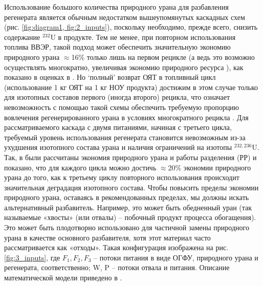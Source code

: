 Использование большого количества природного урана для разбавления регенерата является обычным недостатком вышеупомянутых каскадных схем (рис. \ref{fig:diagram1, fig:2_inputs}), поскольку необходимо, прежде всего, снизить содержание $^{232}$U в продукте. Тем не менее, при повторном использования топлива ВВЭР, такой подход может обеспечить значительную экономию природного урана $\approx$16\% только лишь на первом рецикле (а ведь это возможно осуществлять многократно, увеличивая экономию природного ресурса \cite{colemanEvaluationMultipleSelfrecycling2010}), как показано в оценках в \cite{smirnovEvolutionIsotopicComposition2012}. Но `полный' возврат ОЯТ в топливный цикл (использование 1 кг ОЯТ на 1 кг НОУ продукта) достижим в этом случае только для изотопных составов первого (иногда второго) рецикла, что означает невозможность с помощью такой схемы обеспечить требуемую пропорцию вовлечения регенерированного урана в условиях многократного рецикла \cite{smirnovApplyingEnrichmentCapacities2018}.
Для рассматриваемого каскада с двумя питаниями, начиная с третьего цикла, требуемый уровень использования регенерата становится невозможным из-за ухудшения изотопного состава урана и наличия ограничений на изотопы $^{232,236}$U.
Так, в \cite{smirnovApplyingEnrichmentCapacities2018} были рассчитаны экономия природного урана и работы разделения (РР) и показано, что для каждого цикла можно достичь $\approx$20\% экономии природного урана до того, как к третьему циклу повторного использования происходит значительная деградация изотопного состава.
Чтобы повысить пределы экономии природного урана, оставаясь в рекомендованных пределах, мы должны искать альтернативный разбавитель. Например, это может быть обедненный уран (так называемые «хвосты» (или отвалы) -- побочный продукт процесса обогащения). Это может быть плодотворно использовано для частичной замены природного урана в качестве основного разбавителя, хотя этот материал часто рассматривается как «отходы». Такая конфигурация изображена на рис. \ref{fig:3_inputs}, где $F_{1}, F_{2}, F_{3}$ -- потоки питания в виде ОГФУ, природного урана и регенерата, соответственно; W, P -- потоки отвала и питания. Описание математической модели приведено в \cite{smirnovEnrichmentRegeneratedUranium2014}.

